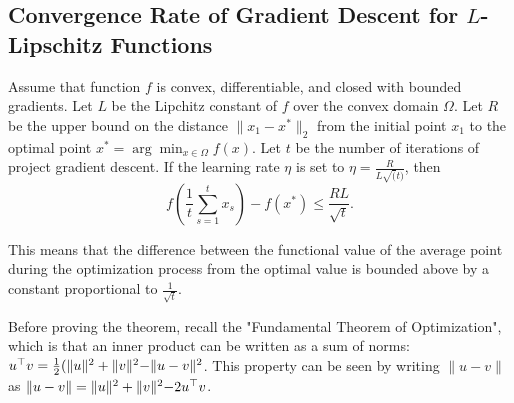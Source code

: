 \subsection{Convergence Rate of Gradient Descent for $L$-Lipschitz Functions}

\begin{theorem}

Assume that function $f$ is convex, differentiable, and closed with bounded
gradients. Let $L$ be the Lipchitz constant of $f$ over the convex domain
$\Omega$. Let $R$ be the upper bound on the distance $\lVert x_1 - x^* \rVert_2$
from the initial point $x_1$ to the optimal point $x^* = \arg\min_{x \in \Omega} f(x)$.
Let $t$ be the number of iterations of project gradient descent.
If the learning rate $\eta$ is set to $\eta=\frac{R}{L \sqrt(t)}$,
then $$f\left(\frac{1}{t}\sum_{s=1}^t x_s\right) - f\left(x^*\right) \leq
\frac{RL}{\sqrt{t}}.$$
\end{theorem}

This means that the difference between the functional value of the average
point during the optimization process from the optimal value is bounded above
by a constant proportional to $\frac{1}{\sqrt{t}}$.

Before proving the theorem, recall the "Fundamental Theorem of Optimization",
which is that an inner product can be written as a sum of norms: $u^\top v =
\frac{1}{2}(\lVert u \rVert^2 + \lVert v \lVert^2 - \lVert u - v \rVert^2$.
This property can be seen by writing $\lVert u - v \rVert$ as $\lVert u - v
\rVert = \lVert u \rVert^2 + \lVert v \lVert^2 - 2 u^\top v$.

